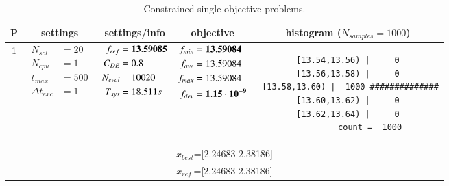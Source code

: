 
\begin{table*} [!t] \centering
\caption{Constrained single objective problems.}
\scriptsize  \setlength{\tabcolsep}{0.5em}

\begin{tabular}[c]{ccccc} \toprule
P & settings & settings/info & objective & histogram ($N_{samples}=1000$) \\ \hline

1
&
{$\!\begin{aligned}
    N_{sol}        &= 20 \\
	N_{cpu}        &= 1 \\
	t_{max}        &= 500 \\
	\Delta t_{exc} &= 1
\end{aligned}$}
&
{$\!\begin{aligned}
	f_{ref} &= {\bf 13.59085} \\
	C_{DE}   &= 0.8 \\
	N_{eval} &= 10020 \\
	T_{sys}  &= 18.511s
\end{aligned}$}
&
{$\!\begin{aligned}
    f_{min} &= {\bf 13.59084} \\
    f_{ave} &= 13.59084 \\
    f_{max} &= 13.59084 \\
    f_{dev} &= {\bf 1.15\cdot 10^{-9}}
\end{aligned}$}
&
\begin{minipage}{4.1cm} \fontsize{5pt}{6pt}
\begin{verbatim}
 [13.54,13.56) |     0 
 [13.56,13.58) |     0 
 [13.58,13.60) |  1000 ##############
 [13.60,13.62) |     0 
 [13.62,13.64) |     0 
         count =  1000
 \end{verbatim}
\end{minipage} \\
\multicolumn{5}{c}{{\scriptsize $x_{best}$=[2.24683 2.38186]}} \\
\multicolumn{5}{c}{{\scriptsize $x_{ref.}$=[2.24683 2.38186]}} \\

\hline




\end{tabular}
\end{table*}

